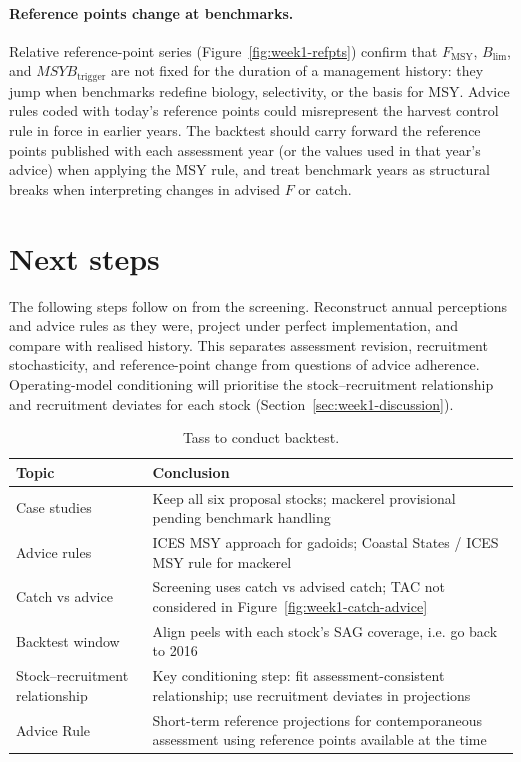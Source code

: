 \documentclass[11pt,a4paper]{extarticle}
\begin{document}
\paragraph{Reference points change at benchmarks.}
Relative reference-point series (Figure~\ref{fig:week1-refpts}) confirm that
\(F_{\mathrm{MSY}}\), \(B_{\lim}\), and \(MSYB_{\mathrm{trigger}}\) are not
fixed for the duration of a management history: they jump when benchmarks
redefine biology, selectivity, or the basis for MSY. Advice rules coded with
today's reference points could misrepresent the harvest control rule in force
in earlier years. The backtest should carry forward the reference points
published with each assessment year (or the values used in that year's
advice) when applying the MSY rule, and treat benchmark years as structural
breaks when interpreting changes in advised \(F\) or catch.


\section{Next steps}

The following steps follow on from the screening. Reconstruct annual perceptions and advice rules as they were, project under perfect implementation, and compare with realised history. This separates assessment revision, recruitment stochasticity, and reference-point change from questions of advice adherence. Operating-model conditioning will prioritise the stock--recruitment relationship and recruitment deviates for each stock
(Section~\ref{sec:week1-discussion}).

\begin{table}[H]
\centering
\caption{Tass to conduct backtest.}
\label{tab:week1-implications}
\begin{tabular}{@{}lp{10.5cm}@{}}
\toprule
Topic & Conclusion \\
\midrule
Case studies & Keep all six proposal stocks; mackerel provisional pending benchmark handling \\
Advice rules & ICES MSY approach for gadoids; Coastal States / ICES MSY rule for mackerel \\
Catch vs advice & Screening uses catch vs advised catch; TAC not considered in Figure~\ref{fig:week1-catch-advice} \\
Backtest window & Align peels with each stock's SAG coverage, i.e. go back to 2016 \\
Stock--recruitment relationship & Key conditioning step: fit assessment-consistent relationship; use recruitment deviates in projections \\
Advice Rule & Short-term reference projections for contemporaneous assessment using reference points available at the time \\
\bottomrule
\end{tabular}
\end{table}
\end{document}
